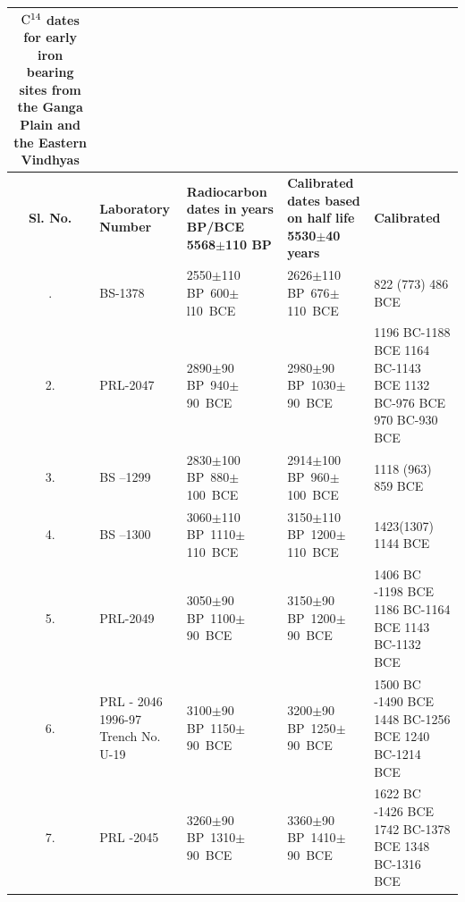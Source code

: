 {{\setlength\tabcolsep{2pt}
{\fontsize{8}{10}\selectfont
\begin{longtable}{|c|p{1.6cm}|p{2cm}|p{2cm}|p{2cm}|}
\captionsetup{font=footnotesize}
\caption{${\rm C}^{14}$ dates for early iron bearing sites from the\\ Ganga Plain and the Eastern Vindhyas} \label{table III.8}\\
\hline
\multicolumn{1}{|m{.5cm}|}{\centering \textbf{Sl. No.}} &
\multicolumn{1}{m{1.6cm}|}{\centering \textbf{Laboratory Number}} &
\multicolumn{1}{m{2cm}|}{\centering \textbf{Radiocarbon dates in years BP/BCE 5568$\pm$110 BP}} & 
\multicolumn{1}{m{2cm}|}{\centering \textbf{Calibrated dates based on half life 5530$\pm$40 years}} & 
\multicolumn{1}{m{2cm}|}{\centering \textbf{Calibrated}}\\
\endfirsthead
\hline
\endhead
\hline
\endfoot
\hline
1. & BS-1378  & 2550$\pm$110 \hbox{BP 600$\pm$l10 BCE} & 2626$\pm$110 \hbox{BP 676$\pm$110 BCE} & 822 (773) 486 BCE\\
2. & PRL-2047  & 2890$\pm$90 \hbox{BP 940$\pm$90 BCE} & 2980$\pm$90 \hbox{BP 1030$\pm$90 BCE} & 1196 BC-1188 BCE 1164 BC-1143 BCE 1132 BC-976 BCE 970 BC-930 BCE \\
3. & BS –1299  & 2830$\pm$100 \hbox{BP 880$\pm$100 BCE} & 2914$\pm$100 \hbox{BP 960$\pm$100 BCE} & 1118 (963) 859 BCE\\
4. & BS –1300  & 3060$\pm$110 \hbox{BP 1110$\pm$110 BCE} & 3150$\pm$110 \hbox{BP 1200$\pm$110 BCE} & 1423(1307) 1144 BCE\\
5. & PRL-2049  & 3050$\pm$90 \hbox{BP 1100$\pm$90 BCE} & 3150$\pm$90 \hbox{BP 1200$\pm$90 BCE} & 1406 BC -1198 BCE 1186 BC-1164 BCE 1143 BC-1132 BCE\\
6. & PRL - 2046 1996-97 Trench No. U-19 & 3100$\pm$90 \hbox{BP 1150$\pm$90 BCE} & 3200$\pm$90 \hbox{BP 1250$\pm$90 BCE} &1500 BC -1490 BCE 1448 BC-1256 BCE 1240 BC-1214 BCE\\
7. & PRL -2045  & 3260$\pm$90 \hbox{BP 1310$\pm$90 BCE} & 3360$\pm$90 \hbox{BP 1410$\pm$90 BCE} & 1622 BC -1426 BCE 1742 BC-1378 BCE 1348 BC-1316 BCE
\end{longtable}
}}

}
